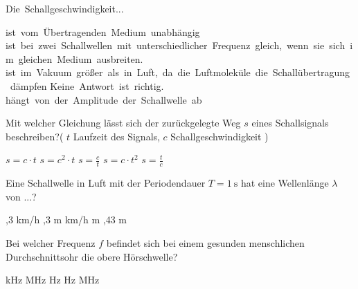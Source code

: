 \documentclass[11pt]{exam}
\begin{document}
\setlength{\voffset}{-0.5in}
\setlength{\headsep}{5pt}

\hspace{2mm}
 \hspace{5mm}
\vspace{4mm}

\begin{questions}

\question Die Schallgeschwindigkeit...

\begin{choices}
	\choice ist vom Übertragenden Medium unabhängig
	\choice ist bei zwei Schallwellen mit unterschiedlicher Frequenz gleich, wenn sie sich im gleichen Medium ausbreiten.
	\choice ist im Vakuum größer als in Luft, da die Luftmoleküle die Schallübertragung dämpfen
	\choice Keine Antwort ist richtig.
	\choice hängt von der Amplitude der Schallwelle ab
\end{choices}

\vspace{3mm}\question Mit welcher Gleichung lässt sich der zurückgelegte Weg \( s \) eines Schallsignals beschreiben?( \( t \) Laufzeit des Signals, \( c \) Schallgeschwindigkeit )

\begin{choices}
	\choice \( s=c \cdot t \)
	\choice \( s=c^2 \cdot t \)
	\choice \( s= \frac{c}{t} \)
	\choice \( s = c \cdot t^2 \)
	\choice \( s= \frac{t}{c} \)
\end{choices}

\vspace{3mm}\question Eine Schallwelle in Luft mit der Periodendauer \( T= \mathrm{1~s} \) hat eine Wellenlänge \( \lambda \) von ...?

\begin{choices}
	,3 km/h
	,3 m
	 km/h
	 m
	,43 m
\end{choices}

\vspace{3mm}\question Bei welcher Frequenz \( f \) befindet sich bei einem gesunden menschlichen Durchschnittsohr die obere Hörschwelle?

\begin{choices}
	 kHz
	 MHz
	 Hz
	 Hz
	 MHz
\end{choices}


\end{questions}
\end{document}
